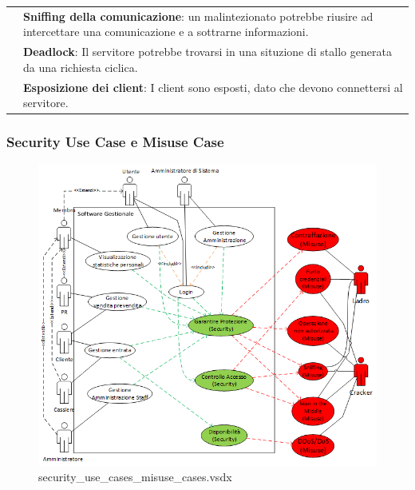 \documentclass[a4paper]{article}
\begin{document}
\begin{center}
\begin{tabularx}{1\textwidth}{|l|X|}
                                   & \textbf{Sniffing della comunicazione}: un malintezionato potrebbe riusire ad intercettare una comunicazione e a sottrarne informazioni. \\
                                   & \textbf{Deadlock}: Il servitore potrebbe trovarsi in una situzione di stallo generata da una richiesta ciclica. \\
                                   & \textbf{Esposizione dei client}: I client sono esposti, dato che devono connettersi al servitore.\\
        \hline
    \end{tabularx}
\end{center}

\subsubsection{Security Use Case e Misuse Case}



\begin{figure}[H]
    \includegraphics[scale=0.9]{Analisi/Cases/security_use_cases_misuse_cases.png}
    \centering
    \caption{security\_use\_cases\_misuse\_cases.vsdx}
\end{figure}
\end{document}
